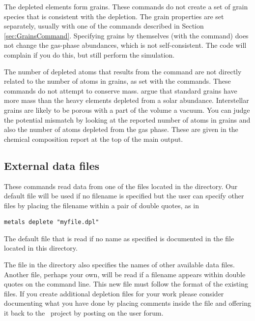 The depleted elements form grains.  
These commands do not create a set of grain species that is consistent
with the depletion.
The grain properties are set separately, usually with one of the
 commands described in Section \ref{sec:GrainsCommand}.
Specifying grains by themselves (with the  command)
does not change the gas-phase abundances,
which is not self-consistent.  The
code will complain if you do this, but still perform the simulation.


The number of depleted atoms that results from the  command are not directly
related to the number of atoms in grains, as set with the  commands.
These commands do not attempt to conserve mass.
\citet{Snow1996} argue that standard grains have more mass than the
heavy elements depleted from a solar abundance.
Interstellar grains are likely to be  porous with a  part of the
volume a vacuum.
You can judge the potential mismatch by looking at the reported number of
atoms in grains and also the number of  atoms depleted from the gas phase.
These are given in the chemical composition report at the top of the main output.


\subsection{External data files}

These  commands read data from 
one of the  files located in the
 directory.
Our default file will be used if no filename is specified but
the user can specify other files by placing the filename within
a pair of double quotes, as in
\begin{verbatim}
metals deplete "myfile.dpl"
\end{verbatim}
The default file that is read if no name as specified is documented in the 
file located in this directory.

The  file in the  directory also
specifies the names of other available data files.  
Another file, perhaps your own, will be read if a filename appears within double quotes
on the command line.
This new file must follow the format of the existing  files.
If you create additional depletion files for your work please consider documenting what
you have done by placing comments inside the file and offering it back to the \Cloudy\ project
by posting on the user forum.


